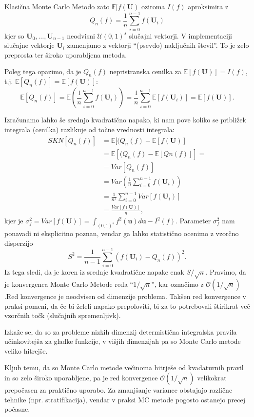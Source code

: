 \documentclass[12pt,a4paper]{amsart}
\theoremstyle{definition} %
\theoremstyle{plain} %
\newcommand{\E}{\mathbb E}
\newcommand{\U}{\boldsymbol U}
\newcommand{\geslo}[2]{\noindent\textbf{#1}\hspace*{3mm}\hangindent=\parindent\hangafter=1 #2}
\begin{document}
Klasična Monte Carlo Metodo zato $\E[f(\U)$ oziroma $I(f)$ aproksimira z 
\[Q_n(f) = \frac{1}{n} \sum_{i=0}^{n-1} f(\U_i)
\]
kjer so $\U_0,\ldots,\U_{n-1}$ neodvisni $\mathcal{U}(0,1)^s$ slučajni vektorji.  V implementaciji slučajne vektorje $\U_i$ zamenjamo z vektorji ``(psevdo) naključnih števil''.
To je zelo preprosta ter široko uporabljena metoda.

Poleg tega opazimo, da je $Q_n(f)$  nepristranska cenilka za $\E[f(\U)] = I(f)$, t.j. $\E[Q_n(f)] = \E[f(\U)]$:
\[
\E[Q_n(f)] = \E\left( \frac{1}{n} \sum_{i=0}^{n-1} f(\U_i)\right) = \frac{1}{n}  \sum_{i=0}^{n-1}\E[ f(\U_i)] =\E[f(\U)].
\]
\vspace{2mm}

Izračunamo lahko še srednjo kvadratično napako, ki nam pove koliko se približek integrala (cenilka) razlikuje od točne vrednosti integrala:
\vspace{2mm}
\[
\begin{split}
SKN[Q_n(f)] & = \E[(Q_n(f) - \E[f(\U)] \\
& = \E[(Q_n(f) - \E[Qn(f)]] = \\
& = Var[Q_n(f)] \\
& = Var\left(\frac{1}{n} \sum_{i=0}^{n-1} f(\U_i)\right) \\
& = \frac{1}{n^2}  \sum_{i=0}^{n-1} Var[f(\U_i)]\\
& = \frac{Var[f(\U)]}{n},
\end{split}
\]
kjer je $\sigma^2_f = Var[f(\U)] = \int_{(0,1)^s} f^2(\boldsymbol u) d \boldsymbol u - I^{2}(f)$.
Parameter  $\sigma^2_f$ nam ponavadi ni eksplicitno poznan, vendar ga lahko statistično ocenimo z vzorčno disperzijo 
\[
S^2 = \frac{1}{n-1}\sum_{i=0}^{n-1}(f(\U_i) - Q_n(f))^2.
\]
Iz tega sledi, da je koren iz srednje kvadratične napake enak $S/\sqrt{n}$.
Pravimo, da je konvergenca Monte Carlo Metode reda ``$1/\sqrt{n}$'', kar označimo z $\mathcal {O}(1/\sqrt{n})$.Red konvergence je neodvisen od dimenzije problema. Takšen red konvergence v praksi pomeni, da če bi želeli napako prepoloviti, bi za to potrebovali štirikrat več vzorčnih točk (slučajnih spremenljivk).

Izkaže se, da so za probleme nizkih dimenzij determistična integralska pravila učinkovitejša za gladke funkcije, v višjih dimenzijah pa so Monte Carlo metode veliko hitrejše.

Kljub temu, da so Monte Carlo metode večinoma hitrješe od kvadaturnih pravil in so zelo široko uporabljene, pa je red konvergence  $\mathcal {O}(1/\sqrt{n})$ velikokrat prepočasen za praktično uporabo. Za zmanjšanje variance obstajajo različne tehnike (npr. stratifikacija), vendar v praksi MC metode pogosto ostanejo precej počasne.

%
%




\end{document}
